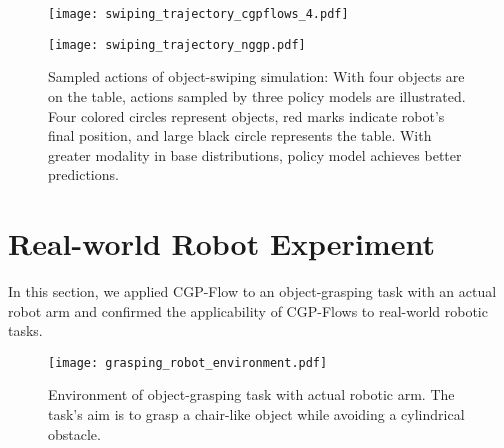 \documentclass[sn-mathphys-num]{sn-jnl}
\begin{document}
\begin{figure}[t]
    \centering
    \begin{minipage}[b]{0.49\linewidth}
        \centering
        \texttt{[image: swiping\_trajectory\_cgpflows\_4.pdf]}
        \label{fig:swiping:action:a}
    \end{minipage}
    \begin{minipage}[b]{0.49\linewidth}
        \centering
        \texttt{[image: swiping\_trajectory\_nggp.pdf]}
        \label{fig:swiping:action:b}
    \end{minipage}
    \caption{Sampled actions of object-swiping simulation: With four objects are on the table, actions sampled by three policy models are illustrated. Four colored circles represent objects, red marks indicate robot's final position, and large black circle represents the table. With greater modality in base distributions, policy model achieves better predictions.}
    \label{fig:swiping:action}
\end{figure}

\section{Real-world Robot Experiment}
In this section, we applied CGP-Flow to an object-grasping task with an actual robot arm and confirmed the applicability of CGP-Flows to real-world robotic tasks.

\begin{figure}[t]
    \centering
    \texttt{[image: grasping\_robot\_environment.pdf]}
    \caption{Environment of object-grasping task with actual robotic arm. The task's aim is to grasp a chair-like object while avoiding a cylindrical obstacle.}
    \label{fig:grasping:environment}
\end{figure}
\end{document}
